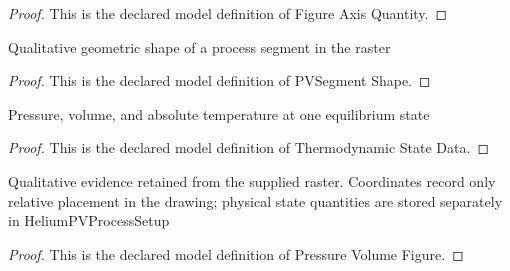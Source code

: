 \begin{proof}
  This is the declared model definition of Figure Axis Quantity.
\end{proof}
\begin{definition}
  \label{def:physics:phyx-mini-0367:phyxminiproblems-problemphyxmini0367-pvsegmentshape}
  Qualitative geometric shape of a process segment in the raster
\end{definition}
\begin{proof}
  This is the declared model definition of PVSegment Shape.
\end{proof}
\begin{definition}
  \label{def:physics:phyx-mini-0367:phyxminiproblems-problemphyxmini0367-thermodynamicstatedata}
  Pressure, volume, and absolute temperature at one equilibrium state
\end{definition}
\begin{proof}
  This is the declared model definition of Thermodynamic State Data.
\end{proof}
\begin{definition}
  \label{def:physics:phyx-mini-0367:phyxminiproblems-problemphyxmini0367-pressurevolumefigure}
  Qualitative evidence retained from the supplied raster. Coordinates record only relative placement in the drawing; physical state quantities are stored separately in HeliumPVProcessSetup
\end{definition}
\begin{proof}
  This is the declared model definition of Pressure Volume Figure.
\end{proof}
